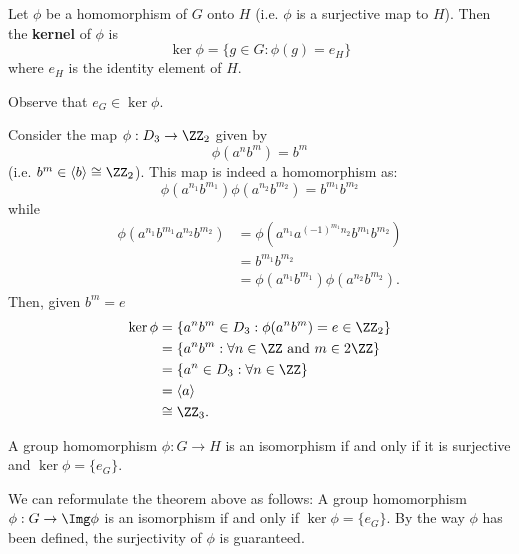 \documentclass[12pt, a4paper]{article}
\begin{document}
\begin{definition}
    Let \(\phi\) be a homomorphism of \(G\) onto \(H\) (i.e. \(\phi\) is a surjective map to \(H\)). Then the \textbf{kernel} of \(\phi\) is 
    \[\ker \phi =\{g\in G : \phi(g)=e_H\}\]
    where \(e_H\) is the identity element of \(H\).
\end{definition}

\begin{mdremark}
    Observe that \(e_G \in \ker \phi\).
\end{mdremark}

\begin{example}
    Consider the map \(\phi : D_3 \to \ZZ_2\) given by 
    \[\phi(a^n b^m) =b^m\]
    (i.e. \(b^m \in \langle b \rangle \cong \ZZ_2\)). This map is indeed a homomorphism as:
    \[\phi(a^{n_1} b^{m_1})\phi(a^{n_2} b^{m_2}) = b^{m_1} b^{m_2}\]
    while
    \[\begin{aligned}
        \phi(a^{n_1} b^{m_1} a^{n_2} b^{m_2}) &= \phi(a^{n_1} a^{(-1)^{m_1}n_2} b^{m_1} b^{m_2}) \\
        &= b^{m_1} b^{m_2} \\
        &=\phi(a^{n_1} b^{m_1})\phi(a^{n_2} b^{m_2}).
    \end{aligned}\]
    Then, given \(b^m =e\)
    \[\begin{aligned}
        \ker \phi &= \{a^n b^m \in D_3 : \phi(a^n b^m) = e \in \ZZ_2\} \\
        &= \{a^n b^m : \forall n \in \ZZ \text{ and } m \in 2\ZZ\} \\
        &= \{a^n \in D_3 : \forall n \in \ZZ\}\\
        &= \langle a \rangle \\
        &\cong \ZZ_3.
    \end{aligned}\]
\end{example}

\begin{mdthm}
    A group homomorphism \(\phi : G\to H\) is an isomorphism if and only if it is surjective and \(\ker \phi = \{e_G\}\).
\end{mdthm}

\begin{mdremark}
    We can reformulate the theorem above as follows:
    A group homomorphism \(\phi : G\to \Img \phi\) is an isomorphism if and only if \(\ker \phi = \{e_G\}\).
    By the way \(\phi\) has been defined, the surjectivity of \(\phi\) is guaranteed.
\end{mdremark}
\end{document}
